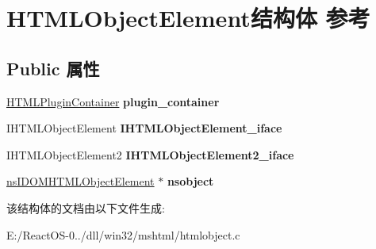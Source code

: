 \hypertarget{struct_h_t_m_l_object_element}{}\section{H\+T\+M\+L\+Object\+Element结构体 参考}
\label{struct_h_t_m_l_object_element}
\subsection*{Public 属性}
\begin{DoxyCompactItemize}
\item 
\mbox{\label{struct_h_t_m_l_object_element_a1e800147f36ef61f5c1c19afb5c2e749}} 
\hyperlink{struct_h_t_m_l_plugin_container}{H\+T\+M\+L\+Plugin\+Container} {\bfseries plugin\+\_\+container}
\item 
\mbox{\label{struct_h_t_m_l_object_element_a4b7e4bd813d812e88aa67d03a5366cb2}} 
I\+H\+T\+M\+L\+Object\+Element {\bfseries I\+H\+T\+M\+L\+Object\+Element\+\_\+iface}
\item 
\mbox{\label{struct_h_t_m_l_object_element_a44d8cf051c0ac669352120dd2c47900d}} 
I\+H\+T\+M\+L\+Object\+Element2 {\bfseries I\+H\+T\+M\+L\+Object\+Element2\+\_\+iface}
\item 
\mbox{\label{struct_h_t_m_l_object_element_a023e2601ba89e469ec1d680bff81f363}} 
\hyperlink{interfacens_i_d_o_m_h_t_m_l_object_element}{ns\+I\+D\+O\+M\+H\+T\+M\+L\+Object\+Element} $\ast$ {\bfseries nsobject}
\end{DoxyCompactItemize}


该结构体的文档由以下文件生成\+:\begin{DoxyCompactItemize}
\item 
E\+:/\+React\+O\+S-\/0../dll/win32/mshtml/htmlobject.\+c\end{DoxyCompactItemize}
